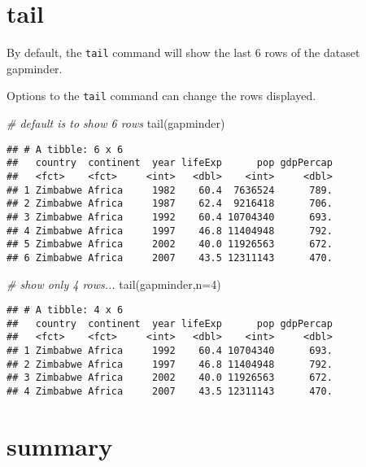\documentclass[
]{book}
\newenvironment{Shaded}{\begin{snugshade}}{\end{snugshade}}
\newcommand{\AttributeTok}[1]{\textcolor[rgb]{0.77,0.63,0.00}{#1}}
\newcommand{\CommentTok}[1]{\textcolor[rgb]{0.56,0.35,0.01}{\textit{#1}}}
\newcommand{\DecValTok}[1]{\textcolor[rgb]{0.00,0.00,0.81}{#1}}
\newcommand{\FunctionTok}[1]{\textcolor[rgb]{0.00,0.00,0.00}{#1}}
\newcommand{\NormalTok}[1]{#1}
\begin{document}
\hypertarget{tail}{%
\section{tail}\label{tail}}

By default, the \texttt{tail} command will show the last 6 rows of the dataset gapminder.

Options to the \texttt{tail} command can change the rows displayed.

\begin{Shaded}
\begin{Highlighting}[]
\CommentTok{\# default is to show 6 rows}
\FunctionTok{tail}\NormalTok{(gapminder)}
\end{Highlighting}
\end{Shaded}

\begin{verbatim}
## # A tibble: 6 x 6
##   country  continent  year lifeExp      pop gdpPercap
##   <fct>    <fct>     <int>   <dbl>    <int>     <dbl>
## 1 Zimbabwe Africa     1982    60.4  7636524      789.
## 2 Zimbabwe Africa     1987    62.4  9216418      706.
## 3 Zimbabwe Africa     1992    60.4 10704340      693.
## 4 Zimbabwe Africa     1997    46.8 11404948      792.
## 5 Zimbabwe Africa     2002    40.0 11926563      672.
## 6 Zimbabwe Africa     2007    43.5 12311143      470.
\end{verbatim}

\begin{Shaded}
\begin{Highlighting}[]
\CommentTok{\# show only 4 rows...}
\FunctionTok{tail}\NormalTok{(gapminder,}\AttributeTok{n=}\DecValTok{4}\NormalTok{)}
\end{Highlighting}
\end{Shaded}

\begin{verbatim}
## # A tibble: 4 x 6
##   country  continent  year lifeExp      pop gdpPercap
##   <fct>    <fct>     <int>   <dbl>    <int>     <dbl>
## 1 Zimbabwe Africa     1992    60.4 10704340      693.
## 2 Zimbabwe Africa     1997    46.8 11404948      792.
## 3 Zimbabwe Africa     2002    40.0 11926563      672.
## 4 Zimbabwe Africa     2007    43.5 12311143      470.
\end{verbatim}

\hypertarget{summary}{%
\section{summary}\label{summary}}
\end{document}
